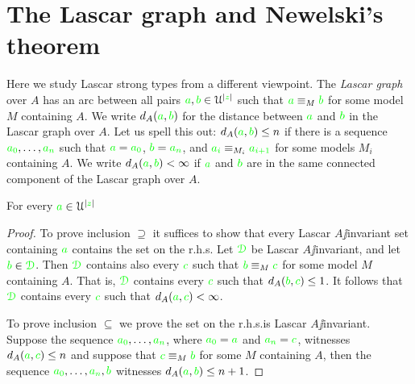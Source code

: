 \documentclass[creche.tex]{subfiles}
\begin{document}
\section{The Lascar graph and Newelski's theorem}\label{newelski}

Here we study Lascar strong types from a different viewpoint. The \emph{Lascar graph\/} over $A$ has an arc between all pairs ${\color{green} a},{\color{green} b}\in \EuScript U^{|{\color{green} z}|}$ such that  ${\color{green} a}\equiv_M{\color{green} b}$ for some model $M$ containing $A$. We write \emph{$d_A({\color{green} a},{\color{green} b})$\/} for the distance between ${\color{green} a}$ and ${\color{green} b}$ in the Lascar graph over $A$. Let us spell this out: $d_A({\color{green} a},{\color{green} b})\le n$ if there is a sequence ${\color{green} a_0},\dots,{\color{green} a_n}$ such that ${\color{green} a}={\color{green} a_0}$, ${\color{green} b}={\color{green} a_n}$, and ${\color{green} a_i}\equiv_{M_i}{\color{green} a_{i+1}}$ for some models $M_i$ containing $A$. We write \emph{$d_A({\color{green} a},{\color{green} b})<\infty$\/} if ${\color{green} a}$ and ${\color{green} b}$ are in the same connected component of the Lascar graph over $A$.

\begin{proposition}\label{tipoforteLascarediametro} For every ${\color{green} a}\in\EuScript U^{|{\color{green} z}|}$

\end{proposition}


\begin{proof}
To prove inclusion $\supseteq$ it suffices to show that every Lascar $A\jj$invariant set containing ${\color{green} a}$ contains the set on the r.h.s. Let ${\color{green}\EuScript D}$ be Lascar $A\jj$invariant, and let ${\color{green} b}\in{\color{green}\EuScript D}$. Then ${\color{green}\EuScript D}$ contains also every ${\color{green} c}$ such that ${\color{green} b}\equiv_M{\color{green} c}$ for some model $M$ containing $A$. That is, ${\color{green}\EuScript D}$ contains every ${\color{green} c}$ such that $d_A({\color{green} b},{\color{green} c})\le 1$. It follows that ${\color{green}\EuScript D}$ contains every ${\color{green} c}$ such that $d_A({\color{green} a},{\color{green} c})<\infty$. 

To prove inclusion $\subseteq$ we prove the set on the r.h.s.\@ is Lascar $A\jj$invariant. Suppose the sequence ${\color{green} a_0},\dots,{\color{green} a_n}$, where ${\color{green} a_0}={\color{green} a}$ and ${\color{green} a_n}={\color{green} c}$, witnesses $d_A({\color{green} a},{\color{green} c})\le n$ and suppose that ${\color{green} c}\equiv_M{\color{green} b}$ for some $M$ containing $A$, then the sequence ${\color{green} a_0},\dots,{\color{green} a_n},{\color{green} b}$ witnesses $d_A({\color{green} a},{\color{green} b})\le n+1$.
\end{proof}
\end{document}
